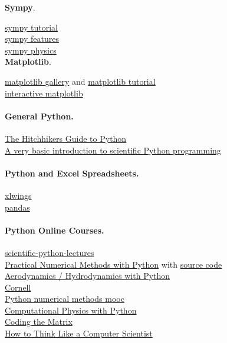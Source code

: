 \documentclass[%
oneside,                 %
final,                   %
10pt]{article}
\begin{document}
\textbf{Sympy}.

\href{{http://docs.sympy.org/dev/tutorial/intro.html}}{sympy tutorial} \\
\href{{http://www.sympy.org/en/features.html}}{sympy features} \\
\href{{http://docs.sympy.org/dev/modules/physics/mechanics/}}{sympy physics} \\

\textbf{Matplotlib}.

\href{{http://matplotlib.org/gallery.html}}{matplotlib gallery} and \href{{https://github.com/rougier/matplotlib-tutorial}}{matplotlib tutorial}  \\
\href{{http://central.scipy.org/item/84/1/simple-interactive-matplotlib-plots}}{interactive matplotlib} \\

\paragraph{General Python.}
\href{{http://docs.python-guide.org/en/latest/}}{The Hitchhikers Guide to Python} \\
\href{{http://hplgit.github.io/bumpy/doc/pub/._basics000.html#table_of_contents}}{A very basic introduction to scientific Python programming}  \\

\paragraph{Python and Excel Spreadsheets.}
\href{{http://www.xlwings.org}}{xlwings} \\
\href{{http://pandas.pydata.org}}{pandas} \\

\paragraph{Python Online Courses.}
\href{{https://github.com/jrjohansson/scientific-python-lectures}}{scientific-python-lectures}  \\
\href{{http://openedx.seas.gwu.edu/courses/GW/MAE6286/2014_fall/about}}{Practical Numerical Methods with Python} with \href{{https://github.com/numerical-mooc/numerical-mooc}}{source code} \\
\href{{http://openedx.seas.gwu.edu/courses/GW/MAE6226/2014_spring/about}}{Aerodynamics / Hydrodynamics with Python} \\
\href{{http://pages.physics.cornell.edu/~sethna/StatMech/ComputerExercises/PythonSoftware/}}{Cornell}  \\
\href{{http://openedx.seas.gwu.edu/courses/GW/MAE6286/2014_fall/about}}{Python numerical methods mooc}  \\
\href{{http://www-personal.umich.edu/~mejn/computational-physics/}}{Computational Physics with Python} \\
\href{{http://cs.brown.edu/courses/cs053/current/index.htm}}{Coding the Matrix} \\
\href{{http://interactivepython.org/runestone/static/thinkcspy/index.html}}{How to Think Like a Computer Scientist} \\
\end{document}
